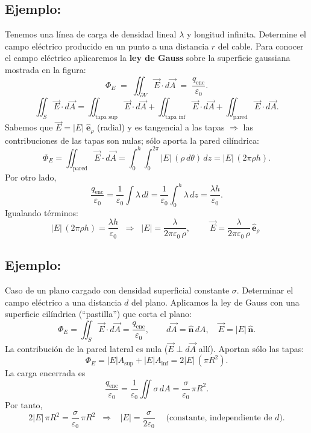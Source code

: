 \documentclass[a4paper,12pt]{article}
\begin{document}
\subsection*{Ejemplo:}
\noindent
Tenemos una línea de carga de densidad lineal \(\lambda\) y longitud infinita.
Determine el campo eléctrico producido en un punto a una distancia \(r\) del cable. Para conocer el campo eléctrico aplicaremos la \textbf{ley de Gauss} sobre la superficie gaussiana mostrada en la figura:
\[
\Phi_{E} \;=\; \iint_{\partial V} \vec E\cdot d\vec A
\;=\; \frac{q_{\text{enc}}}{\varepsilon_{0}}.
\]
\[
\iint_{S}\vec E\!\cdot d\vec A
=\iint_{\text{tapa sup}}\vec E\!\cdot d\vec A
+\iint_{\text{tapa inf}}\vec E\!\cdot d\vec A
+\iint_{\text{pared}}\vec E\!\cdot d\vec A .
\]
Sabemos que \(\vec E=|\!E|\;\hat{\mathbf e}_\rho\) (radial) y es tangencial a las tapas \(\Rightarrow\)
las contribuciones de las tapas son nulas; sólo aporta la pared cilíndrica:
\[
\Phi_E=\iint_{\text{pared}} \vec E\!\cdot d\vec A
=\int_{0}^{h}\!\!\int_{0}^{2\pi} |\!E|\,(\rho\,d\theta)\,dz
=|\!E|\,(2\pi\rho h).
\]
Por otro lado,
\[
\frac{q_{\text{enc}}}{\varepsilon_0}
=\frac{1}{\varepsilon_0}\int \lambda\,dl
=\frac{1}{\varepsilon_0}\int_{0}^{h}\lambda\,dz
=\frac{\lambda h}{\varepsilon_0}.
\]
Igualando términos:
\[
|\!E|\,(2\pi\rho h)=\frac{\lambda h}{\varepsilon_0}
\;\;\Longrightarrow\;\;
|\!E|=\frac{\lambda}{2\pi\varepsilon_0\,\rho},
\qquad
\boxed{\;\vec E=\dfrac{\lambda}{2\pi\varepsilon_0\,\rho}\,\hat{\mathbf e}_\rho\;}
\]

\subsection*{Ejemplo:}
\noindent
Caso de un plano cargado con densidad superficial constante \(\sigma\). Determinar el campo eléctrico a una distancia \(d\) del plano. Aplicamos la ley de Gauss con una superficie cilíndrica (“pastilla”) que corta el plano:
\[
\Phi_E=\iint_{S}\vec E\!\cdot d\vec A=\frac{q_{\text{enc}}}{\varepsilon_0},
\qquad
d\vec A=\hat{\mathbf n}\,dA,\quad \vec E=|\!E|\,\hat{\mathbf n}.
\]
La contribución de la pared lateral es nula (\(\vec E\perp d\vec A\) allí). Aportan sólo las tapas:
\[
\Phi_E=|\!E|A_{\text{sup}}+|\!E|A_{\text{inf}}
=2|\!E|\,(\pi R^{2}).
\]
La carga encerrada es
\[
\frac{q_{\text{enc}}}{\varepsilon_0}
=\frac{1}{\varepsilon_0}\iint \sigma\,dA
=\frac{\sigma}{\varepsilon_0}\,\pi R^{2}.
\]
Por tanto,
\[
2|\!E|\,\pi R^{2}=\frac{\sigma}{\varepsilon_0}\,\pi R^{2}
\;\;\Longrightarrow\;\;
\boxed{\;|\!E|=\dfrac{\sigma}{2\varepsilon_0}\;}
\quad\text{(constante, independiente de \(d\)).}
\]
\end{document}
